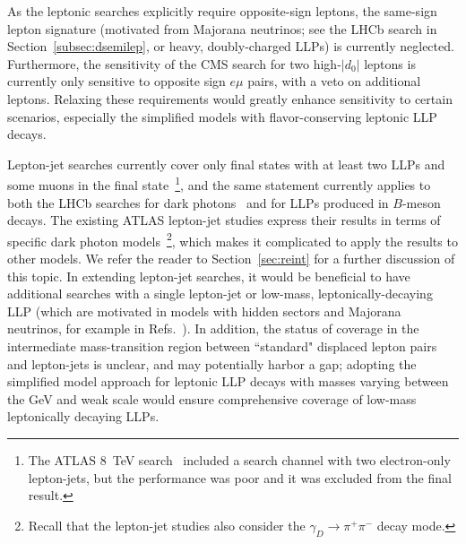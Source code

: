 As the leptonic searches explicitly require opposite-sign leptons, the same-sign lepton signature (motivated from Majorana neutrinos; see the LHCb search in Section~\ref{subsec:dsemilep}, or heavy, doubly-charged LLPs) is currently neglected. Furthermore, the sensitivity of the CMS search for two high-$|d_0|$ leptons is currently only sensitive to opposite sign $e\mu$ pairs, with a veto on additional leptons. Relaxing these requirements would greatly enhance sensitivity to certain scenarios, especially the simplified models with flavor-conserving leptonic LLP decays.

Lepton-jet searches currently cover only final states with at least two LLPs and some muons in the final state~\footnote{The ATLAS 8~TeV search~\cite{Aad:2014yea} included a search channel with two electron-only lepton-jets, but the performance was poor and it was excluded from the final result.}, and the same statement currently applies to both the LHCb searches for dark photons~\cite{Aaij:2016rxn,Aaij:2017rft} and for LLPs produced in $B$-meson decays. The existing ATLAS lepton-jet studies express their results in terms of specific dark photon models~\footnote{Recall that the lepton-jet studies also consider the $\gamma_D \to \pi^+ \pi^-$ decay mode.}, which makes it complicated to apply the results to other models. We refer the reader to Section~\ref{sec:reint} for a further discussion of this topic. In extending lepton-jet searches, it would be beneficial to have additional searches with a single lepton-jet or low-mass, leptonically-decaying LLP (which are motivated in models with hidden sectors and Majorana neutrinos, for example in Refs.~\cite{Izaguirre:2015pga,Izaguirre:2015zva}). In addition, the status of coverage in the intermediate mass-transition region between ``standard" displaced lepton pairs and lepton-jets is unclear, and may potentially harbor a gap; adopting the simplified model approach for leptonic LLP decays with masses varying between the GeV and weak scale would ensure comprehensive coverage of low-mass leptonically decaying LLPs.

